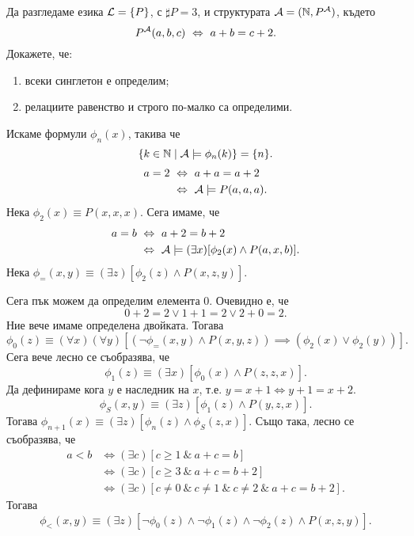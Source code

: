 \begin{problem}
  Да разгледаме езика $\mathcal{L} = \{P\}$, с $\sharp P = 3$, и структурата $\mathcal{A} = (\mathbb{N}, P^{\mathcal{A}})$, където
  \[P^{\mathcal{A}}(a,b,c) \ \Leftrightarrow\  a + b = c+2.\]
  Докажете, че:
  \begin{enumerate}
  \item
    всеки синглетон е определим;
  \item
    релациите равенство и строго по-малко са определими.
  \end{enumerate}
\end{problem}
\begin{solution}
  Искаме формули $\phi_n(x)$, такива че
  \[\{k \in \mathbb{N} \mid \mathcal{A} \models \phi_n(k)\} = \{n\}.\]
  \begin{align*}
    a = 2 & \ \Leftrightarrow\  a + a = a + 2\\
          & \ \Leftrightarrow\  \mathcal{A} \models P(a,a,a).
  \end{align*}
  Нека $\phi_2(x) \equiv P(x,x,x)$.
  Сега имаме, че
  \begin{align*}
    a = b & \ \Leftrightarrow\  a + 2 = b + 2\\
          & \ \Leftrightarrow\  \mathcal{A} \models (\exists x)[ \phi_2(x) \land P(a,x,b)].
  \end{align*}
  Нека $\phi_{=}(x,y) \equiv (\exists z)[ \phi_2(z) \land P(x,z,y)]$.
  
  Сега пък можем да определим елемента $0$.
  Очевидно е, че
  \[0 + 2 = 2 \lor 1 + 1 = 2 \lor 2+0 = 2.\]
  Ние вече имаме определена двойката. Тогава
  \[\phi_0(z) \equiv (\forall x)(\forall y)[ (\neg \phi_{=}(x,y) \land P(x,y,z)) \implies (\phi_2(x) \lor \phi_2(y))].\]
  Сега вече лесно се съобразява, че
  \[\phi_{1}(z) \equiv (\exists x)[\phi_0(x) \land P(z,z,x)].\]
  Да дефинираме кога $y$ е наследник на $x$, т.е. 
  $y = x + 1 \iff y + 1 = x + 2$.
  \[\phi_{S}(x,y) \equiv (\exists z)[\phi_1(z) \land P(y,z,x)].\]
  Тогава $\phi_{n+1}(x) \equiv (\exists z)[\phi_n(z) \land \phi_S(z,x)]$.
  Също така, лесно се съобразява, че
  \begin{align*}
    a < b & \iff (\exists c)[c \geq 1\ \&\ a + c = b]\\
          & \iff (\exists c)[ c \geq 3\ \&\ a + c = b + 2]\\
          & \iff (\exists c)[ c \neq 0\ \&\ c \neq 1\ \&\ c \neq 2\ \&\ a + c = b + 2].
  \end{align*}
  Тогава
  \[\phi_{<}(x,y) \equiv (\exists z)[\neg \phi_0(z) \land \neg \phi_1(z) \land \neg \phi_2(z) \land P(x,z,y)].\]
\end{solution}

